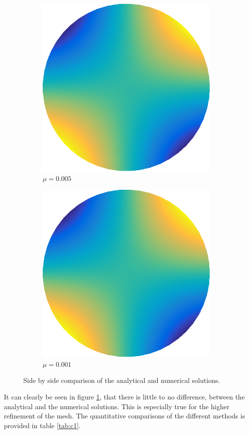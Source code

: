 \documentclass[../fem.tex]{subfile}
\begin{document}
\begin{figure}[htpb]
\begin{subfigure}{0.4\textwidth}
    \includegraphics[width=0.8\linewidth]{figures/c1c/approx.png}
    \caption{$\mu=0.005$}
  \end{subfigure}
  \begin{subfigure}{0.4\textwidth}
    \centering
    \includegraphics[width=0.8\linewidth]{figures/c1d/approx.png}
    \caption{$\mu=0.001$}
  \end{subfigure}
  \caption{Side by side comparison of the analytical and numerical solutions.}
  \label{fig:d1_soln}
\end{figure}

It can clearly be seen in figure \ref{fig:d1_soln}, that there is little to no
difference, between the analytical and the numerical solutions. This is
especially true for the higher refinement of the mesh. The quantitative
comparisons of the different methods is provided in table
\ref{tab:c1}.
\end{document}
